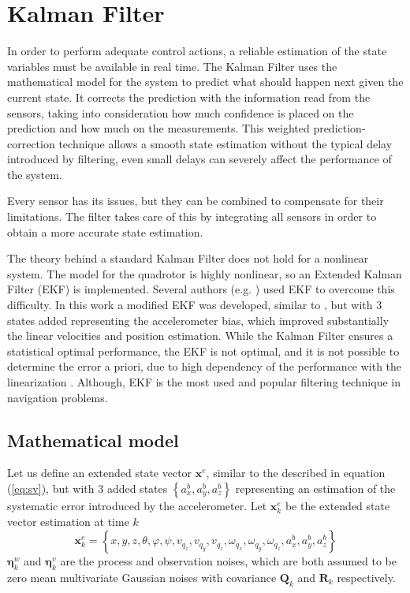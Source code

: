 \documentclass[conference]{IEEEtran}
\newcommand{\refp}[1]{(\ref{#1})}
\begin{document}
\section{Kalman Filter}

In order to perform adequate control actions, a reliable estimation of the state variables must be available in real time. The Kalman Filter uses the mathematical model for the system to predict what should happen next given the current state. It corrects the prediction with the information read from the sensors, taking into consideration how much confidence is placed on the prediction and how much on the measurements. This weighted prediction-correction technique allows a smooth state estimation without the typical delay introduced by filtering, even small delays can severely affect the performance of the system.

Every sensor has its issues, but they can be combined to compensate for their limitations. The filter takes care of this by integrating all sensors in order to obtain a more accurate state estimation. 

The theory behind a standard Kalman Filter does not hold for a nonlinear system. The model for the quadrotor is highly nonlinear, so an Extended Kalman Filter (EKF) is implemented. Several authors (e.g. \cite{bib:kalman,bib:kalman2}) used EKF to overcome this difficulty. In this work a modified EKF was developed, similar to \cite{bib:kalman,bib:kalman2}, but with 3 states added representing the accelerometer bias, which improved substantially the linear velocities and position estimation. While the Kalman Filter ensures a statistical optimal performance, the EKF is not optimal, and it is not possible to determine the error a priori, due to high dependency of the performance with the linearization \cite{bib:kay}. Although, EKF is the most used and popular filtering technique in navigation problems. 

\subsection{Mathematical model}

Let us define an extended state vector $\mathbf{x}^e$, similar to the described in equation \refp{eq:sv}, but with 3 added states $\left\lbrace a_x^b,a_y^b,a_z^b\right\rbrace$ representing an estimation of the systematic error introduced by the accelerometer. Let $\mathbf{x}_k^e$ be the extended state vector estimation at time $k$
$$
\mathbf{x}^e_k = \left\lbrace  x,y,z, \theta,\varphi,\psi, v_{q_z},v_{q_y},v_{q_z},\omega_{q_x},\omega_{q_y},\omega_{q_z}, a_x^b,a_y^b,a_z^b \right\rbrace
$$
$\boldsymbol{\eta}^{w}_{k}$ and $\boldsymbol{\eta}^{v}_{k}$ are the process and observation noises, which are both assumed to be zero mean multivariate Gaussian noises with covariance $\mathbf{Q}_k$ and $\mathbf{R}_k$ respectively. 
\end{document}
